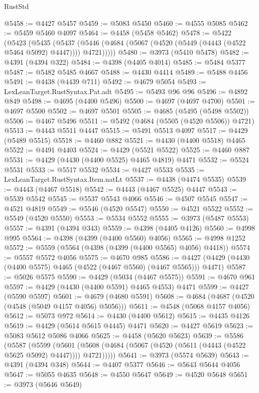 \begin{lexlean}{RustStd}
\begin{coremodule}
{\begin{coremodule}
{{{{{{{{{{{{{{{{{{{{{{{{{{{{{{{{{{{{{{{{{{{{{{{{{{{{{{{{{{{{{{{{{{{{@5458 := @4427 @5457
@5459 := @5083 @5450
@5460 := @4555 @5085
@5462 := @5459 @5460 @4097
@5464 := @4458 (@5458 @5462)
@5478 := @5422
    (@5423
      (@5435
        (@5437 (@5446 (@4684 (@5067 (@4520 (@5449 (@4443 (@4522 @5464 @5092) @4447)))) @4721)))))
@5480 := @3973 (@5410 @5478)
@5482 := @4391 (@4394 @322)
@5484 := @4398 (@4405 @4014)
@5485 := @5484 @5377
@5487 := @5482 @5485 @4667
@5488 := @4430 @4414
@5489 := @5488 @4456
@5491 := @4438 (@4439 @711)
@5492 := @4679 @5054
@5493 := LexLeanTarget.RustSyntax.Pat.adt
@5495 := @5493 @96 @96
@5496 := @4892 @849
@5498 := @4695 (@4400 @5496)
@5500 := @4697 (@4697 @4700)
@5501 := @4697 @5500
@5502 := @4697 @5501
@5505 := @4685 (@5495 (@5498 @5502))
@5506 := @4467 @5496
@5511 := @5492 (@4684 (@5505 (@4520 @5506)) @4721)
@5513 := @4443 @5511 @4447
@5515 := @5491 @5513 @4097
@5517 := @4429 (@5489 @5515)
@5518 := @4460 @882
@5521 := @4430 (@4400 @5518) @4465
@5522 := @4491 @4403
@5524 := @4429 (@5521 @5522)
@5525 := @4460 @887
@5531 := @4429 (@4430 (@4400 @5525) @4465 @4819) @4471
@5532 := @5524 @5531
@5533 := @5517 @5532
@5534 := @4427 @5533
@5535 := LexLeanTarget.RustSyntax.Item.natLt
@5537 := @4438 (@4474 @5535)
@5539 := @4443 (@4467 @5518)
@5542 := @4443 (@4467 @5525) @4447
@5543 := @5539 @5542
@5545 := @5537 @5543 @4066
@5546 := @4507 @5545
@5547 := @4521 @4819
@5549 := @5546 (@4520 @5547)
@5550 := @4521 @5522
@5552 := @5549 (@4520 @5550)
@5553 := @5534 @5552
@5555 := @3973 (@5487 @5553)
@5557 := @4391 (@4394 @343)
@5559 := @4398 (@4405 @4126)
@5560 := @4998 @995
@5564 := @4398 (@4399 (@4400 @5560) @4056)
@5565 := @4998 @1252
@5572 := @5559 (@5564 (@4398 (@4399 (@4400 @5565) @4056) @4418))
@5574 := @5557 @5572 @4056
@5575 := @4670 @985
@5586 := @4427 (@4429 (@4430 (@4400 @5575) @4465 (@4522 (@4467 @5560) (@4467 @5565))) @4471)
@5587 := @5026 @5575
@5590 := @4429 (@5034 (@4467 @5575))
@5591 := @4670 @961
@5597 := @4429 (@4430 (@4400 @5591) @4465 @4553) @4471
@5599 := @4427 (@5590 @5597)
@5601 := @4679 (@4680 @5591)
@5608 := @4684 (@4687 (@4520 (@4548 (@5049 @4157 @4056) @5056)))
@5611 := @4548 (@5068 @4157 @4056)
@5612 := @5073 @972
@5614 := @4430 (@4400 @5612)
@5615 := @4435 @4126
@5619 := @4429 (@5614 @5615 @4445) @4471
@5620 := @4427 @5619
@5623 := @5083 @5612 @5086 @4066
@5625 := @4458 (@5620 @5623)
@5639 := @5586
    (@5587
      (@5599
        (@5601 (@5608 (@4684 (@5067 (@4520 (@5611 (@4443 (@4522 @5625 @5092) @4447)))) @4721)))))
@5641 := @3973 (@5574 @5639)
@5643 := @4391 (@4394 @348)
@5644 := @4407 @5377
@5646 := @5643 @5644 @4056
@5647 := @5055 @4635
@5648 := @4550 @5647
@5649 := @4520 @5648
@5651 := @3973 (@5646 @5649)
}}}}}}}}}}}}}}}}}}}}}}}}}}}}}}}}}}}}}}}}}}}}}}}}}}}}}}}}}}}}}}}}}}}}
\end{coremodule}}
\end{coremodule}
\end{lexlean}
